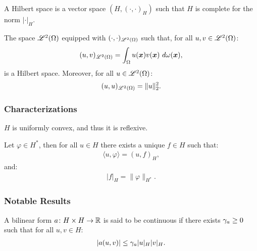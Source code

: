\begin{definition} %
    A Hilbert space is a vector space $(H, (\cdot, \cdot)_H)$ such that $H$ is complete for the norm $\lvert \cdot \rvert_H$.
\end{definition}

\begin{remark}
    The space $\mathscr{L}^{2}(\Omega)$ equipped with $(\cdot, \cdot)_{\mathscr{L}^{2}(\Omega)}$ such that, for all $u, v \in \mathscr{L}^{2}(\Omega)$:
    \begin{align}
        (u, v)_{\mathscr{L}^{2}(\Omega)} = \int_{\Omega} u(\bm{x}) v(\bm{x}) ~ d \omega(\bm{x}),
    \end{align}
    is a Hilbert space. Moreover, for all $u \in \mathscr{L}^{2}(\Omega)$:
    \begin{align}
        (u, u)_{\mathscr{L}^{2}(\Omega)} = \lVert u \rVert_2^2.
    \end{align}
\end{remark}

\subsubsection{Characterizations}

\begin{theorem}
    $H$ is uniformly convex, and thus it is reflexive.
\end{theorem}

\begin{theorem}
    Let $\varphi \in H^*$, then for all $u \in H$ there exists a unique $f \in H$ such that:
    \begin{align}
        \langle u, \varphi \rangle = (u, f)_H,
    \end{align}
    and:
    \begin{align}
        \lvert f \rvert_H = \lVert \varphi \rVert_{H^*}.
    \end{align}
\end{theorem}

\subsubsection{Notable Results}

\begin{definition}
    A bilinear form $a \colon H \times H \rightarrow \mathbb{R}$ is said to be continuous if there exists $\gamma_{a} \geq 0$ such that for all $u, v \in H$:
    \begin{align}
        \lvert a(u, v) \rvert \leq \gamma_{a} \lvert u \rvert_H \lvert v \rvert_H.
    \end{align}
\end{definition}

